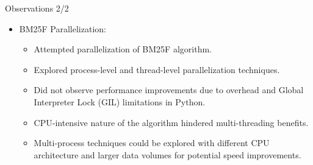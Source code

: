 \documentclass{beamer}
\begin{document}
\begin{frame}{Observations 2/2}
\begin{itemize}
    \item BM25F Parallelization:
    \begin{itemize}
    \item Attempted parallelization of BM25F algorithm.
    \item Explored process-level and thread-level parallelization techniques.
    \item Did not observe performance improvements due to overhead and Global Interpreter Lock (GIL) limitations in Python.
    \item CPU-intensive nature of the algorithm hindered multi-threading benefits.
    \item Multi-process techniques could be explored with different CPU architecture and larger data volumes for potential speed improvements.
    \end{itemize}
    \end{itemize}
\end{frame}
\end{document}
